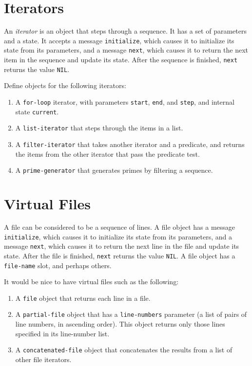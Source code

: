 \section{Iterators}

An {\it iterator} is an object that steps through a sequence.  It has a set
of parameters and a state.  It accepts a message {\tt initialize}, which
causes it to initialize its state from its parameters, and a message
{\tt next}, which causes it to return the next item in the sequence and
update its state.  After the sequence is finished, {\tt next} returns the
value {\tt NIL}.

Define objects for the following iterators:
\begin{enumerate}
\item A {\tt for-loop} iterator, with parameters {\tt start}, {\tt end}, and
{\tt step}, and internal state {\tt current}.

\item A {\tt list-iterator} that steps through the items in a list.

\item A {\tt filter-iterator} that takes another iterator and a predicate, and
returns the items from the other iterator that pass the predicate test.

\item A {\tt prime-generator} that generates primes by filtering a sequence.
\end{enumerate}

\section{Virtual Files}

A file can be considered to be a sequence of lines.  A file object has
a message {\tt initialize}, which causes it to initialize its state from
its parameters, and a message {\tt next}, which causes it to return the
next line in the file and update its state.  After the file is finished,
{\tt next} returns the value {\tt NIL}.  A file object has a {\tt file-name}
slot, and perhaps others.

It would be nice to have virtual files such as the following:
\begin{enumerate}
\item A {\tt file} object that returns each line in a file.

\item A {\tt partial-file} object that has a {\tt line-numbers} parameter
(a list of pairs of line numbers, in ascending order).  This object
returns only those lines specified in its line-number list.

\item A {\tt concatenated-file} object that concatenates the results from a
list of other file iterators.
\end{enumerate}


